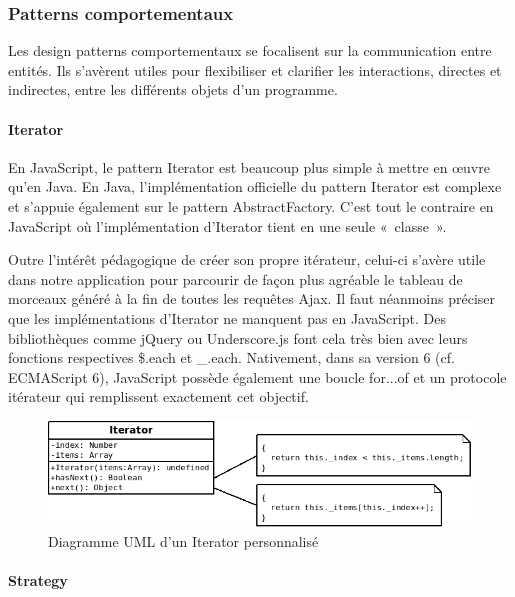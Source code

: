 \documentclass[a4paper,12pt]{article}
\begin{document}
\subsubsection{Patterns comportementaux}

Les design patterns comportementaux se focalisent sur la communication entre entités. Ils s'avèrent utiles pour flexibiliser et clarifier les interactions, directes et indirectes, entre les différents objets d'un programme.

\paragraph{Iterator}

En JavaScript, le pattern Iterator est beaucoup plus simple à mettre en œuvre qu'en Java. En Java, l'implémentation officielle du pattern Iterator est complexe et s'appuie également sur le pattern AbstractFactory. C'est tout le contraire en JavaScript où l'implémentation d'Iterator tient en une seule «~classe~».

Outre l'intérêt pédagogique de créer son propre itérateur, celui-ci s'avère utile dans notre application pour parcourir de façon plus agréable le tableau de morceaux généré à la fin de toutes les requêtes Ajax. Il faut néanmoins préciser que les implémentations d'Iterator ne manquent pas en JavaScript. Des bibliothèques comme jQuery ou Underscore.js font cela très bien avec leurs fonctions respectives \$.each et \_.each. Nativement, dans sa version 6 (cf. ECMAScript 6), JavaScript possède également une boucle for...of et un protocole itérateur qui remplissent exactement cet objectif.

\vspace{10pt}

\begin{figure}[!h]
  \begin{center}
    \includegraphics[scale=0.5]{Iterator.png}
    \caption{Diagramme UML d'un Iterator personnalisé}
  \end{center}
\end{figure}

\paragraph{Strategy}
\end{document}
